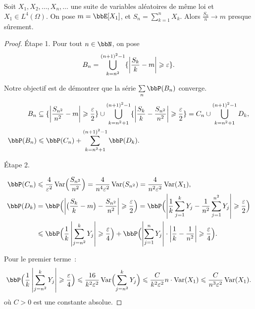 \begin{prop}
    Soit $X_1, X_2, \ldots, X_n, \ldots$ une suite de variables aléatoires de même loi et $X_1 \in L^4(\Omega)$.
    On pose $m = \bbE[X_1]$, et $S_n = \sum\limits_{k = 1}^n X_k$.
    Alors $\frac{S_n}{n} \to m$ presque sûrement.
\end{prop}

\begin{proof}
    Étape 1.
    Pour tout $n \in \bbN$, on pose
    \[ B_n = \bigcup_{k = n^2}^{(n + 1)^2 - 1} \{ \left\lvert \frac{S_k}{k} - m \right\rvert \geqslant \varepsilon \}. \]

    Notre objectif est de démontrer que la série $\sum\limits_{n} \bbP(B_n)$ converge.
    \begin{align*}
        B_n       & \subseteq \{ \lrvert{\frac{S_{n^2}}{n^2} - m} \geqslant \frac{\varepsilon}{2} \}
        \cup \bigcup_{k = n^2 + 1}^{(n + 1)^2 - 1} \{ \lrvert{\frac{S_k}{k} - \frac{S_{n^2}}{n^2}}
        \geqslant \frac{\varepsilon}{2} \} = C_n \cup \bigcup_{k = n^2 + 1}^{(n + 1)^2 - 1} D_k,     \\
        \bbP(B_n) & \leqslant \bbP(C_n) + \sum_{k = n^2 + 1}^{(n + 1)^2 - 1} \bbP(D_k).
    \end{align*}

    Étape 2.

    \begin{align*}
        \bbP(C_n) & \leqslant \frac{4}{\varepsilon^2} \var\Bigl(\frac{S_{n^2}}{n^2}\Bigr)
        = \frac{4}{n^4 \varepsilon^2} \var(S_{n^2}) = \frac{4}{n^2 \varepsilon^2} \var(X_1),                                       \\
        \bbP(D_k) & = \bbP\Bigl(\lrvert{\bigl(\frac{S_k}{k} - m\bigr) - \frac{S_{n^2}}{n^2}} \geqslant \frac{\varepsilon}{2}\Bigr)
        = \bbP\Bigl(\lrvert{\frac{1}{k} \sum_{j = 1}^k Y_j - \frac{1}{n^2} \sum_{j = 1}^{n^2} Y_j}
        \geqslant \frac{\varepsilon}{2}\Bigr)                                                                                      \\
                  & \leqslant \bbP\Bigl(\frac{1}{k} \lrvert{\sum_{j = n^2}^k Y_j} \geqslant \frac{\varepsilon}{4}\Bigr)
        + \bbP\Bigl(\lrvert{\sum_{j = 1}^n Y_j} \cdot \lrvert{\frac{1}{k} - \frac{1}{n^2}} \geqslant \frac{\varepsilon}{4}\Bigr).
    \end{align*}

    Pour le premier terme~:
    \[ \bbP\Bigl(\frac{1}{k} \lrvert{\sum_{j = n^2}^k Y_j} \geqslant \frac{\varepsilon}{4}\Bigr)
        \leqslant \frac{16}{k^2 \varepsilon^2} \var\Bigl(\sum_{j = n^2}^k Y_j\Bigr)
        \leqslant \frac{C}{k^2 \varepsilon^2} n \cdot \var(X_1)
        \leqslant \frac{C}{n^3 \varepsilon^2} \var(X_1). \]
    où $C > 0$ est une constante absolue.


\end{proof}
